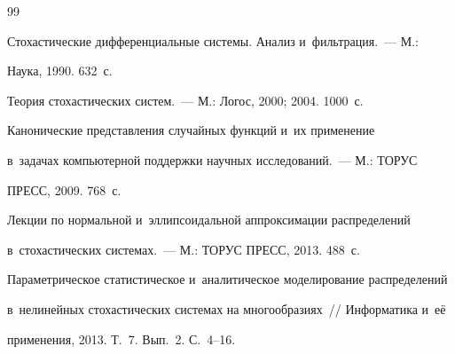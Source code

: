 {\small\frenchspacing

{%


\begin{thebibliography}{99}



Стохастические дифференциальные системы. Анализ и~фильтрация.~--- М.:

Наука,  1990.  632~с. %







Теория стохастических систем.~--- М.: Логос, 2000; 2004. 1000~с.







Канонические представления случайных функций и~их применение 

в~задачах компьютерной поддержки научных исследований.~--- М.: ТОРУС

ПРЕСС, 2009. 768~с.







Лекции по нормальной и~эллипсоидальной аппроксимации распределений 

в~стохастических системах.~--- М.: ТОРУС ПРЕСС, 2013. 488~с.





Параметрическое статистическое и~аналитическое моделирование распределений 

в~нелинейных стохастических системах на многообразиях~/\!\!/ Информатика и~её 

применения, 2013. Т.~7. Вып.~2. С.~4--16.




\end{thebibliography}}}
